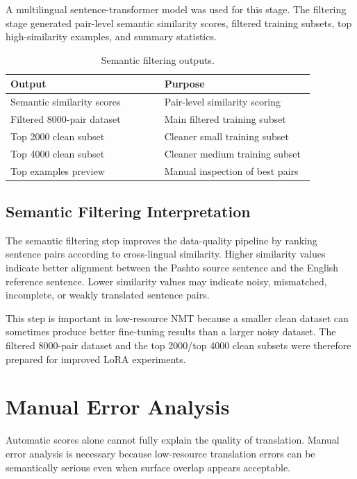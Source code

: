 \documentclass[conference]{IEEEtran}
\begin{document}
A multilingual sentence-transformer model was used for this stage. The filtering stage generated pair-level semantic similarity scores, filtered training subsets, top high-similarity examples, and summary statistics.

\begin{table}[H]
\centering
\caption{Semantic filtering outputs.}
\footnotesize
\begin{tabular}{p{0.44\linewidth}p{0.43\linewidth}}
\toprule
\textbf{Output} & \textbf{Purpose} \\
\midrule
Semantic similarity scores & Pair-level similarity scoring \\
Filtered 8000-pair dataset & Main filtered training subset \\
Top 2000 clean subset & Cleaner small training subset \\
Top 4000 clean subset & Cleaner medium training subset \\
Top examples preview & Manual inspection of best pairs \\
\bottomrule
\end{tabular}
\end{table}

\subsection{Semantic Filtering Interpretation}

The semantic filtering step improves the data-quality pipeline by ranking sentence pairs according to cross-lingual similarity. Higher similarity values indicate better alignment between the Pashto source sentence and the English reference sentence. Lower similarity values may indicate noisy, mismatched, incomplete, or weakly translated sentence pairs.

This step is important in low-resource NMT because a smaller clean dataset can sometimes produce better fine-tuning results than a larger noisy dataset. The filtered 8000-pair dataset and the top 2000/top 4000 clean subsets were therefore prepared for improved LoRA experiments.

\section{Manual Error Analysis}

Automatic scores alone cannot fully explain the quality of translation. Manual error analysis is necessary because low-resource translation errors can be semantically serious even when surface overlap appears acceptable.
\end{document}
